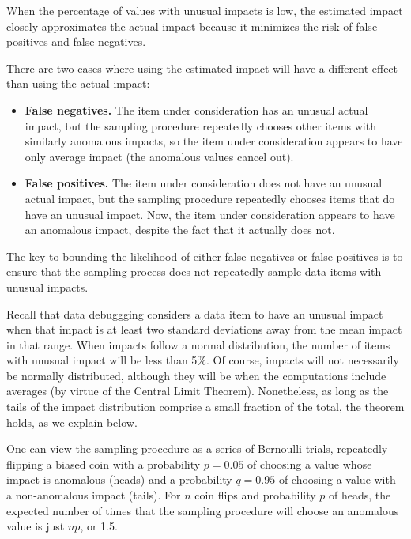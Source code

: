 \begin{theorem}
When the percentage of values with unusual impacts is low, the estimated impact closely approximates the actual impact because it minimizes the risk of false positives and false negatives.
\end{theorem}

\noindent
There are two cases where using the estimated impact will have a different effect than using the actual impact:

\begin{itemize}
\item \textbf{False negatives.} The item under consideration has an
  unusual actual impact, but the sampling procedure repeatedly
  chooses other items with similarly anomalous impacts, so the item under
  consideration appears to have only average impact (the anomalous values cancel out).
\item \textbf{False positives.} The item under consideration does
  not have an unusual actual impact, but the sampling procedure
  repeatedly chooses items that do have an unusual impact. Now, the item
  under consideration appears to have an anomalous impact, despite the fact that it actually does not.
\end{itemize}

The key to bounding the likelihood of either false negatives or false
positives is to ensure that the sampling process does not repeatedly
sample data items with unusual impacts.

Recall that data debuggging considers a data item to have an unusual
impact when that impact is at least two standard deviations away from
the mean impact in that range. When impacts follow a normal
distribution, the number of items with unusual impact will be less
than 5\%. Of course, impacts will not necessarily be normally
distributed, although they will be when the computations include
averages (by virtue of the Central Limit Theorem). Nonetheless, as
long as the tails of the impact distribution comprise a small fraction
of the total, the theorem holds, as we explain below.

One can view the sampling procedure as a series of Bernoulli
trials, repeatedly flipping a biased coin with a probability $p =
0.05$ of choosing a value whose impact is anomalous (heads) and a
probability $q = 0.95$ of choosing a value with a non-anomalous impact
(tails). For $n$ coin flips and probability $p$ of heads, the expected
number of times that the sampling procedure will choose an anomalous
value is just $np$, or 1.5.

